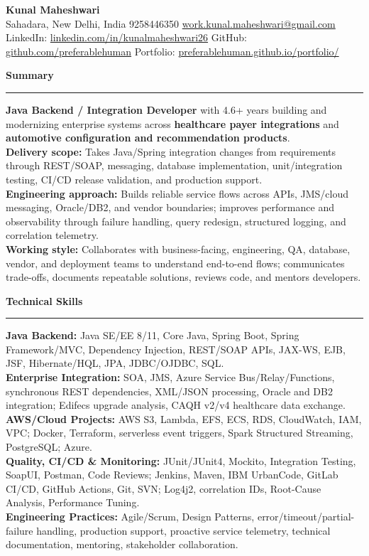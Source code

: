 \documentclass[11pt,letterpaper]{article}
\newcommand{\ressection}[1]{\Needspace{5\baselineskip}\vspace{8pt}\par\textbf{#1}\par\vspace{2pt}\hrule\vspace{5pt}}
\begin{document}
\pagestyle{empty}\raggedright\fontsize{11}{12.5}\selectfont

{\Large \textbf{Kunal Maheshwari}}\\
Sahadara, New Delhi, India \textbar{} 9258446350 \textbar{} \href{mailto:work.kunal.maheshwari@gmail.com}{work.kunal.maheshwari@gmail.com}\\
LinkedIn: \href{https://www.linkedin.com/in/kunalmaheshwari26}{linkedin.com/in/kunalmaheshwari26} \textbar{} GitHub: \href{https://github.com/preferablehuman}{github.com/preferablehuman} \textbar{} Portfolio: \href{https://preferablehuman.github.io/portfolio/}{preferablehuman.github.io/portfolio/}

\ressection{Summary}
\textbf{Java Backend / Integration Developer} with 4.6+ years building and modernizing enterprise systems across \textbf{healthcare payer integrations} and \textbf{automotive configuration and recommendation products}.\\[2pt]
\textbf{Delivery scope:} Takes Java/Spring integration changes from requirements through REST/SOAP, messaging, database implementation, unit/integration testing, CI/CD release validation, and production support.\\[2pt]
\textbf{Engineering approach:} Builds reliable service flows across APIs, JMS/cloud messaging, Oracle/DB2, and vendor boundaries; improves performance and observability through failure handling, query redesign, structured logging, and correlation telemetry.\\[2pt]
\textbf{Working style:} Collaborates with business-facing, engineering, QA, database, vendor, and deployment teams to understand end-to-end flows; communicates trade-offs, documents repeatable solutions, reviews code, and mentors developers.

\ressection{Technical Skills}
\textbf{Java Backend:} Java SE/EE 8/11, Core Java, Spring Boot, Spring Framework/MVC, Dependency Injection, REST/SOAP APIs, JAX-WS, EJB, JSF, Hibernate/HQL, JPA, JDBC/OJDBC, SQL.\\
\textbf{Enterprise Integration:} SOA, JMS, Azure Service Bus/Relay/Functions, synchronous REST dependencies, XML/JSON processing, Oracle and DB2 integration; Edifecs upgrade analysis, CAQH v2/v4 healthcare data exchange.\\
\textbf{AWS/Cloud Projects:} AWS S3, Lambda, EFS, ECS, RDS, CloudWatch, IAM, VPC; Docker, Terraform, serverless event triggers, Spark Structured Streaming, PostgreSQL; Azure.\\
\textbf{Quality, CI/CD \& Monitoring:} JUnit/JUnit4, Mockito, Integration Testing, SoapUI, Postman, Code Reviews; Jenkins, Maven, IBM UrbanCode, GitLab CI/CD, GitHub Actions, Git, SVN; Log4j2, correlation IDs, Root-Cause Analysis, Performance Tuning.\\
\textbf{Engineering Practices:} Agile/Scrum, Design Patterns, error/timeout/partial-failure handling, production support, proactive service telemetry, technical documentation, mentoring, stakeholder collaboration.
\end{document}
